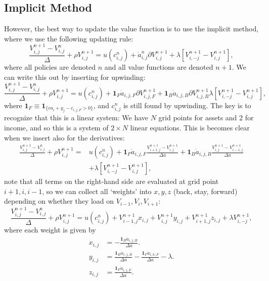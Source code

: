 \documentclass[12pt]{article}
\DeclareMathOperator{\1}{\mathbbm{1}}
\begin{document}
\subsection{Implicit Method}\label{sec:implicitmethod}
However, the best way to update the value function is to use the implicit method, where we use the following updating rule:
\begin{equation}
\frac{V^{n+1}_{i,j} - V^n_{i,j}}\Delta + \rho V^{n+1}_{i,j} =u(c^n_{i,j}) + \dot a^n_{i,j} \partial V^{n+1}_{i,j} + \lambda [V^{n+1}_{i,-j} - V^{n+1}_{i,j}],
\end{equation}
where all policies are denoted $n$ and all value functions are denoted $n+1$. We can write this out by inserting for upwinding:
\begin{equation}
\frac{V^{n+1}_{i,j} - V^n_{i,j}}{\Delta} +  \rho V^{n+1}_{i,j} =u(c^n_{i,j}) + \mathbf{1}_F\dot a_{i,j,F} \partial V^{n+1}_{i,j,F} + \mathbf{1}_B \dot a_{i,j,B} \partial V^{n+1}_{i,j,B} \lambda [V^{n+1}_{i,-j} - V^{n+1}_{i,j}],
\end{equation}
where $\mathbf{1}_F \equiv \mathbf{1}_{\{ra_i + y_j - c_{i,j,F}>0\}}$, and  $c^n_{i,j}$ is still found by upwinding. The key is to recognize that this is a linear system: We have $N$ grid points for assets and $2$ for income, and so this is a system of $2\times N$ linear equations. This is becomes clear when we insert also for the derivatives:
\begin{equation}
\begin{split}
\frac{V^{n+1}_{i,j} - V^n_{i,j}}{\Delta} +  \rho V^{n+1}_{i,j} =&u(c^n_{i,j}) + \mathbf{1}_F\dot a_{i,j,F} \frac{V^{n+1}_{i+1,j} - V^{n+1}_{i,j}}{\Delta a } + \mathbf{1}_B \dot a_{i,j,B} \frac{V^{n+1}_{i,j} - V^{n+1}_{i-1,j}}{\Delta a}  \\
 & + \lambda [V^{n+1}_{i,-j} - V^{n+1}_{i,j}],
\end{split}
\end{equation}
note that all terms on the right-hand side are evaluated at grid point $i+1,i,i-1$, so we can collect all `weights' into $x,y,z$ (back, stay, forward)  depending on whether they load on $V_{i-1},V_i,V_{i+1}$:
\begin{equation}\label{eq:systemeq}
\frac{V^{n+1}_{i,j} - V^n_{i,j}}{\Delta} +  \rho V^{n+1}_{i,j} =u(c^n_{i,j}) + V^{n+1}_{i-1,j}x_{i,j} + V^{n+1}_{i,j}y_{i,j} + V^{n+1}_{i+1,j}z_{i,j}
 + \lambda V^{n+1}_{i,-j},
\end{equation}
where each weight is given by
\begin{align*}
x_{i,j} &=  -\frac{\mathbf{1}_B \dot a_{i,j,B}}{\Delta a}. \\
y_{i,j} &=  \frac{\mathbf{1}_B \dot a_{i,j,B}}{\Delta a} -\frac{\mathbf{1}_F \dot a_{i,h,F}}{\Delta a} - \lambda. \\
z_{i,j} &= \frac{\mathbf{1}_F \dot a_{i,j,F}}{\Delta a}.
\end{align*}
\end{document}
